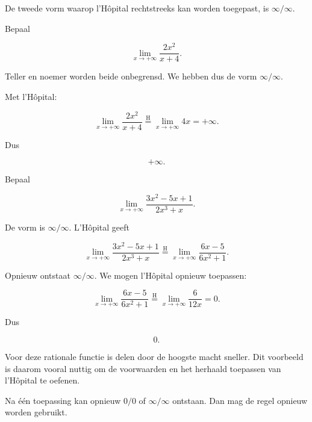 \documentclass{ximera}
\begin{document}


De tweede vorm waarop l'Hôpital rechtstreeks kan worden toegepast, is
\(\infty/\infty\).

\begin{voorbeeld}
Bepaal

\[\lim_{x\to+\infty}\frac{2x^2}{x+4}.\]

Teller en noemer worden beide onbegrensd. We hebben dus de vorm
\(\infty/\infty\).

Met l'Hôpital:

\[
\lim_{x\to+\infty}\frac{2x^2}{x+4}
\overset{\mathrm H}{=}
\lim_{x\to+\infty}4x
=+\infty.
\]

Dus

\[\boxed{+\infty}.\]
\end{voorbeeld}

\begin{voorbeeld}
Bepaal

\[\lim_{x\to+\infty}\frac{3x^2-5x+1}{2x^3+x}.\]

De vorm is \(\infty/\infty\). L'Hôpital geeft

\[
\lim_{x\to+\infty}\frac{3x^2-5x+1}{2x^3+x}
\overset{\mathrm H}{=}
\lim_{x\to+\infty}\frac{6x-5}{6x^2+1}.
\]

Opnieuw ontstaat \(\infty/\infty\). We mogen l'Hôpital opnieuw toepassen:

\[
\lim_{x\to+\infty}\frac{6x-5}{6x^2+1}
\overset{\mathrm H}{=}
\lim_{x\to+\infty}\frac6{12x}
=0.
\]

Dus

\[\boxed{0}.\]

Voor deze rationale functie is delen door de hoogste macht sneller. Dit
voorbeeld is daarom vooral nuttig om de voorwaarden en het herhaald
toepassen van l'Hôpital te oefenen.
\end{voorbeeld}



Na één toepassing kan opnieuw \(0/0\) of \(\infty/\infty\) ontstaan.
Dan mag de regel opnieuw worden gebruikt.
\end{document}
